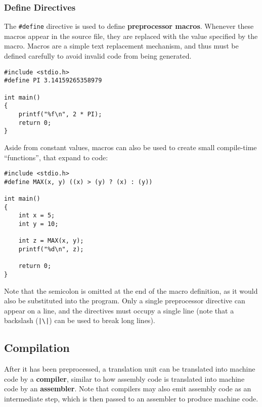 \documentclass{article}
\begin{document}
\subsubsection{Define Directives}
The \texttt{#define} directive is used to define
\textbf{preprocessor macros}. Whenever these macros appear in the
source file, they are replaced with the value specified by the macro.
Macros are a simple text replacement mechanism, and thus must be
defined carefully to avoid invalid code from being generated.
\begin{verbatim}
#include <stdio.h>
#define PI 3.14159265358979

int main()
{
    printf("%f\n", 2 * PI);
    return 0;
}
\end{verbatim}
Aside from constant values, macros can also be used to create small
compile-time ``functions'', that expand to code:
\begin{verbatim}
#include <stdio.h>
#define MAX(x, y) ((x) > (y) ? (x) : (y))

int main()
{
    int x = 5;
    int y = 10;

    int z = MAX(x, y);
    printf("%d\n", z);

    return 0;
}
\end{verbatim}
Note that the semicolon is omitted at the end of the macro definition,
as it would also be substituted into the program. Only a single
preprocessor directive can appear on a line, and the directives must
occupy a single line (note that a backslash
(\texttt{|\backslash|}) can be used to break
long lines).
\subsection{Compilation}
After it has been preprocessed, a translation unit can be translated
into machine code by a \textbf{compiler}, similar to how assembly code
is translated into machine code by an \textbf{assembler}. Note that
compilers may also emit assembly code as an intermediate step, which is
then passed to an assembler to produce machine code.
\end{document}
